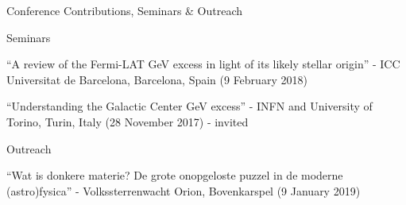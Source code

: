 \begin{rSection}{Conference Contributions, Seminars \& Outreach}
\begin{rSubsection}{Seminars}{}{}{}
    \item “A review of the Fermi-LAT GeV excess in light of its likely stellar origin” - ICC Universitat de Barcelona, Barcelona, Spain (9 February 2018)
    \item “Understanding the Galactic Center GeV excess” - INFN and University of Torino, Turin, Italy (28 November 2017) - invited
\end{rSubsection}

\begin{rSubsection}{Outreach}{}{}{}
    \item “Wat is donkere materie? De grote onopgeloste puzzel in de moderne (astro)fysica” - Volkssterrenwacht Orion,  Bovenkarspel (9 January 2019)
\end{rSubsection}
\end{rSection}
